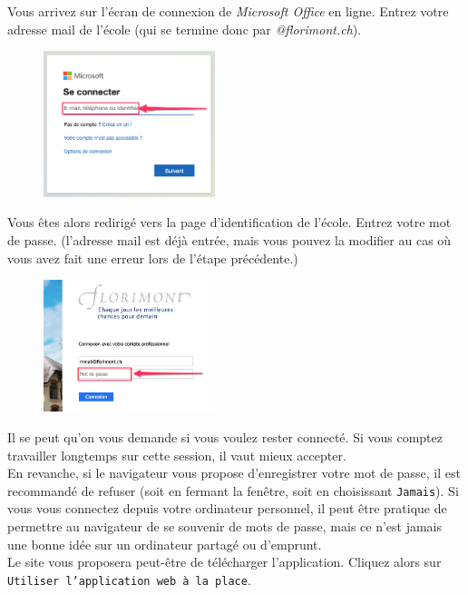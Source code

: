 Vous arrivez sur l'écran de connexion de \emph{Microsoft Office} en ligne. Entrez votre adresse mail de l'école (qui se termine donc par \textit{@florimont.ch}).

\begin{figure}[H]
\includegraphics[width=5cm]{./images/teams/ecran_connexion_office_com_crop}
\centering
\end{figure}

Vous êtes alors redirigé vers la page d'identification de l’école. Entrez votre mot de passe. (l'adresse mail est déjà entrée, mais vous pouvez la modifier au cas où vous avez fait une erreur lors de l'étape précédente.)

\begin{figure}[H]
\includegraphics[width=5cm]{./images/teams/ecran_connexion_florimont_crop}
\centering
\end{figure}

Il se peut qu'on vous demande si vous voulez rester connecté. Si vous comptez travailler longtemps sur cette session, il vaut mieux accepter.\\

En revanche, si le navigateur vous propose d'enregistrer votre mot de passe, il est recommandé de refuser (soit en fermant la fenêtre, soit en choisissant \texttt{Jamais}). Si vous vous connectez depuis votre ordinateur personnel, il peut être pratique de permettre au navigateur de se souvenir de mots de passe, mais ce n'est jamais une bonne idée sur un ordinateur partagé ou d'emprunt.\\

Le site vous proposera peut-être de télécharger l’application. Cliquez alors sur \texttt{Utiliser l’application web à la place}.\\


